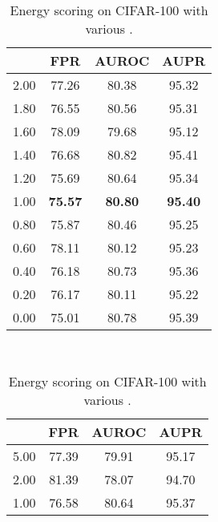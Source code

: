 \documentclass{article}
\begin{document}
\begin{table}[t]
\centering
\parbox{.30\linewidth}{
\centering
\scriptsize
\caption{Energy scoring on CIFAR- with various .} \label{tab: ablation sigma full cifar100}
\vspace{5pt}
{
\begin{tabular}{c|ccc}
\toprule[1.5pt]
            & FPR     & AUROC       & AUPR      \\
\midrule[0.6pt]
2.00               & 77.26                  & 80.38                  & 95.32 \\
1.80               & 76.55                  & 80.56                  & 95.31 \\
1.60               & 78.09                  & 79.68                  & 95.12 \\
1.40               & 76.68                  & 80.82                  & 95.41 \\
1.20               & 75.69                  & 80.64                  & 95.34 \\ 
\cellcolor{greyC}1.00               & \cellcolor{greyC}\textbf{75.57}                  & \cellcolor{greyC}\textbf{80.80}                  & \cellcolor{greyC}\textbf{95.40} \\ 
0.80               & 75.87                  & 80.46                  & 95.25 \\
0.60               & 78.11                  & 80.12                  & 95.23 \\
0.40               & 76.18                  & 80.73                  & 95.36 \\
0.20               & 76.17                  & 80.11                  & 95.22 \\
0.00               & 75.01                  & 80.78                  & 95.39 \\
\bottomrule[1.5pt]      
\end{tabular}
}}~~
\parbox{.30\linewidth}{
\centering
\caption{Energy scoring on CIFAR-100 with various .} 
\scriptsize
\vspace{5pt}
{
\begin{tabular}{c|ccc}
\toprule[1.5pt]
           & FPR     & AUROC      & AUPR      \\
\midrule[0.6pt]
5.00               & 77.39                  & 79.91                  & 95.17 \\
2.00               & 81.39                  & 78.07                  & 94.70 \\
1.00               & 76.58                  & 80.64                  & 95.37 \\

\end{tabular}}}
\end{table}
\end{document}

